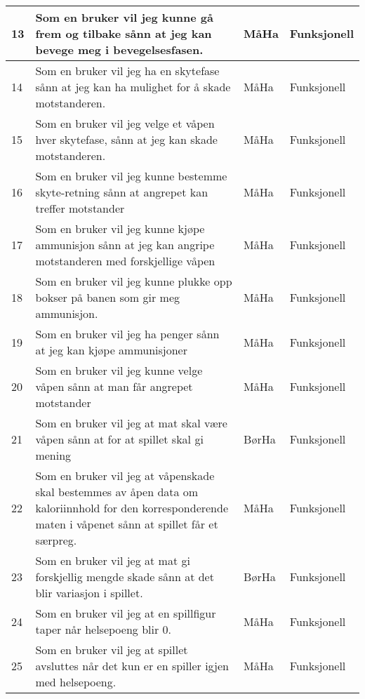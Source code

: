 \documentclass[norsk,a4paper]{article}
\begin{document}
\begin{center}
\begin{tabular}{ | m{0.4cm} | m{6.1cm} | m{2cm} | m{3cm} | }
\hline
13&Som en bruker vil jeg kunne gå frem og tilbake sånn at jeg kan bevege meg i bevegelsesfasen.&MåHa & Funksjonell\\ \hline
14&Som en bruker vil jeg ha en skytefase sånn at jeg kan ha mulighet for å skade motstanderen.&MåHa & Funksjonell\\ \hline
15&Som en bruker vil jeg velge et våpen hver skytefase, sånn at jeg kan skade motstanderen.&MåHa & Funksjonell\\ \hline
16&Som en bruker vil jeg kunne bestemme skyte-retning sånn at angrepet kan treffer motstander&MåHa & Funksjonell\\ \hline
17&Som en bruker vil jeg kunne kjøpe ammunisjon sånn at jeg kan angripe motstanderen med forskjellige våpen&MåHa & Funksjonell\\ \hline
18&Som en bruker vil jeg kunne plukke opp bokser på banen som gir meg ammunisjon.&MåHa &Funksjonell\\ \hline
19&Som en bruker vil jeg ha penger sånn at jeg kan kjøpe ammunisjoner&MåHa & Funksjonell\\ \hline
20&Som en bruker vil jeg kunne velge våpen sånn at man får angrepet motstander&MåHa & Funksjonell\\ \hline
21&Som en bruker vil jeg at mat skal være våpen sånn at for at spillet skal gi mening&BørHa & Funksjonell\\ \hline
22&Som en bruker vil jeg at våpenskade skal bestemmes av åpen data om kaloriinnhold for den korresponderende maten i våpenet sånn at spillet får et særpreg.&MåHa & Funksjonell\\ \hline
23&Som en bruker vil jeg at mat gi forskjellig mengde skade sånn at det blir variasjon i spillet.&BørHa & Funksjonell\\ \hline
24&Som en bruker vil jeg at en spillfigur taper når helsepoeng blir 0.&MåHa & Funksjonell\\ \hline
25&Som en bruker vil jeg at spillet avsluttes når det kun er en spiller igjen med helsepoeng.&MåHa & Funksjonell\\ \hline
\end{tabular}
\end{center}
\end{document}
